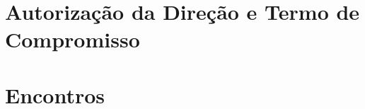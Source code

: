 

\begin{apendicesenv}

    \partapendices %

    \chapter{Autorização da Direção e Termo de Compromisso} \label{ApendiceA}

    \label{ApendiceA.1}
    

    \label{ApendiceA.2}
    

    \chapter{Encontros}
    \label{ApendiceB}
    


    \label{ApendiceC}
    

    \label{ApendiceD}
    


\end{apendicesenv}
